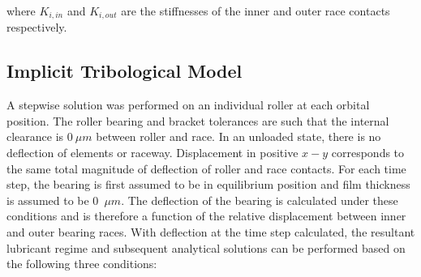 where $K_{i,in}$ and $K_{i,out}$ are the stiffnesses of the inner and outer race contacts respectively.

\subsection{Implicit Tribological Model}

A stepwise solution was performed on an individual roller at each orbital position. The roller bearing and bracket tolerances are such that the internal clearance is $0~\mu m$ between roller and race. In an unloaded state, there is no deflection of elements or raceway. Displacement in positive $x-y$ corresponds to the same total magnitude of deflection of roller and race contacts. For each time step, the bearing is first assumed to be in equilibrium position and film thickness is assumed to be 0~$\mu m$. The deflection of the bearing is calculated under these conditions and is therefore a function of the relative displacement between inner and outer bearing races. With deflection at the time step calculated, the resultant lubricant regime and subsequent analytical solutions can be performed based on the following three conditions:

